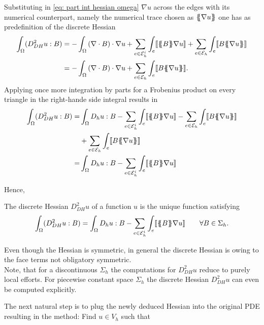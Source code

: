 Substituting in \eqref{eq: part int hessian omega} $\nabla u$ across the edges with its numerical counterpart, namely the numerical trace chosen as $\{\!\!\{ \nabla u \}\!\!\}$ one has as predefinition of the discrete Hessian
	\begin{align}
		\int_\Omega (D_{DH}^2 u : B) 
		&= - \int_\Omega \left(\nabla \cdot B\right) \cdot \nabla u
		+ \sum_{ e \in \edgesi} \int_e  \jump {\average B \nabla u } 
				+ \sum_{ e \in \edges} \int_e \jump {B \average {\nabla u} }  \nonumber \\
		&= - \int_\Omega \left(\nabla \cdot B\right) \cdot \nabla u
				+ \sum_{ e \in \edges} \int_e  \jump{B \average {\nabla u} }.	
	\end{align}
Applying once more integration by parts for a Frobenius product on every triangle in the right-hande side integral results in
	\begin{align}
		\int_\Omega (D_{DH}^2 u : B) 
		=& \int_\Omega D_h u: B 
			-\sum_{ e \in \edgesi} \int_e  \jump {\average B  \nabla u }
			- \sum_{ e \in \edges} \int_e \jump {B \average {\nabla u} }\nonumber \\		
			&+ \sum_{ e \in \edges} \int_e  \jump {B \average {\nabla u} }		\nonumber \\
		=& \int_\Omega D_h u: B -\sum_{ e \in \edgesi} \int_e  \jump {\average B  \nabla u }				
	\end{align}

Hence,
\begin{definition} \label{def: discrete Hessian}
	The discrete Hessian $D_{DH}^2 u$ of a function $u$ is the unique function satisfying
	\begin{align}
		\int_\Omega (D_{DH}^2 u : B) 
		= \int_\Omega D_h u: B -\sum_{ e \in \mathcal{E}_h^i} \int_e  \llbracket \{\!\!\{ B \}\!\!\} \nabla u  \rrbracket\qquad \forall B \in \Sigma_h. \label{eq: discrete hessian}
	\end{align}
\end{definition}

Even though the Hessian is symmetric, in general the discrete Hessian is owing to the face terms not obligatory symmetric. \\
Note, that for a discontinuous $\Sigma_h$ the computations for $D_{DH}^2 u$ reduce to purely local efforts. For piecewise constant space $\Sigma_h$ the discrete Hessian $D_{DH}^2 u$ can even be computed explicitly.

The next natural step is to plug the newly deduced Hessian into the original \MA PDE resulting in the method: Find $u \in V_h$ such that

